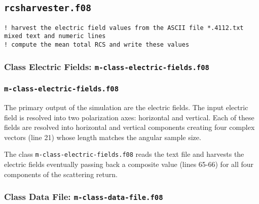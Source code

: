 % 

\subsection{\texttt{rcsharvester.f08}}
\footnotesize{
\texttt{! harvest the electric field values from the ASCII file *.4112.txt mixed text and numeric lines}\\
\texttt{! compute the mean total RCS and write these values}\\
}

\subsubsection{Class Electric Fields: \texttt{m-class-electric-fields.f08}}

\subsubsection{\texttt{m-class-electric-fields.f08}}
The primary output of the simulation are the electric fields. The input electric field is resolved into two polarization axes: horizontal and vertical. Each of these fields are resolved into horizontal and vertical components creating four complex vectors (line 21) whose length matches the angular sample size.

The class \texttt{m-class-electric-fields.f08} reads the text file and harvests the electric fields eventually passing back a composite value (lines 65-66) for all four components of the scattering return.
		



\subsubsection{Class Data File: \texttt{m-class-data-file.f08}}
		

\endinput  %
